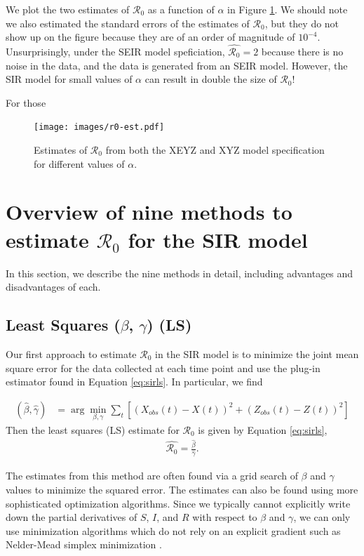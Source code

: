 \documentclass[12pt]{article}
\newcommand{\wxxsir}{nine } %
\newcommand{\rr}{\ensuremath{\mathcal{R}_0}}
\begin{document}
We plot the two estimates of $\rr$ as a function of $\alpha$ in Figure \ref{fig:r0-alpha}.  We should note we also estimated the standard errors of the estimates of $\rr$, but they do not show up on the figure because they are of an order of magnitude of $10^{-4}$.  Unsurprisingly, under the SEIR model speficiation, $\hat{\rr}=2$ because there is no noise in the data, and the data is generated from an SEIR model.  However, the SIR model for small values of $\alpha$ can result in double the size of $\rr$!

For those 

\begin{figure}
  \centering
  \texttt{[image: images/r0-est.pdf]}
  \caption{Estimates of $\rr$ from both the XEYZ and XYZ model specification for different values of $\alpha$.}\label{fig:r0-alpha}
  \end{figure}


\section{Overview of \wxxsir methods to estimate $\rr$ for the SIR model}
\label{sec:methods} 

In this section, we describe the \wxxsir methods in detail, including advantages and disadvantages of each.

\subsection{Least Squares ($\beta$, $\gamma$) (LS)}\label{least-squares-beta-gamma}
Our first approach to estimate $\rr$ in the SIR model is to minimize the joint mean square error for the data collected at each time point and use the plug-in estimator found in Equation \ref{eq:sirls}.  In particular, we find

\begin{align*}
(\hat{\beta}, \hat{\gamma} )&=\arg \min_{\beta, \gamma} \sum_{t} \left [ \left (X_{obs}(t) - X(t)\right )^2 + \left ( Z_{obs}(t) - Z(t) \right )^2 \right ]
\end{align*}
Then the least squares (LS) estimate for $\rr$ is given by Equation \ref{eq:sirls},
\begin{align}\label{eq:sirls}
  \hat{\rr}= \frac{\hat{\beta}}{\hat{\gamma}}.
\end{align}

The estimates from this method are often found via a grid search of $\beta$ and $\gamma$ values to minimize the squared error.  The estimates can also be found using more sophisticated optimization algorithms. Since we typically cannot explicitly write down the partial derivatives of $S$, $I$, and $R$ with respect to $\beta$ and $\gamma$, we can only use minimization algorithms which do not rely on an explicit gradient such as Nelder-Mead simplex minimization \citep{nelder-mead1965}.
\end{document}
